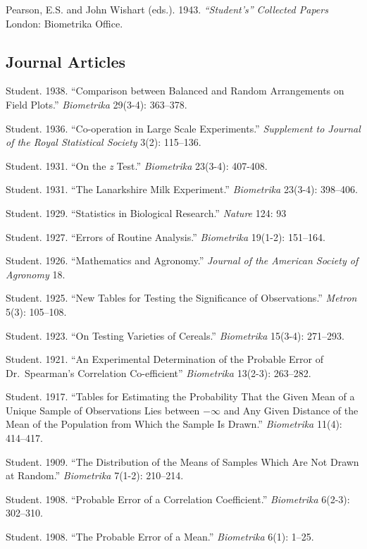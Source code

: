 \documentclass[11pt,]{article}
\begin{document}
Pearson, E.S. and John Wishart (eds.). 1943. \emph{``Student's''
Collected Papers} London: Biometrika Office.

\hypertarget{journal-articles}{%
\subsection{Journal Articles}\label{journal-articles}}

Student. 1938. ``Comparison between Balanced and Random Arrangements on
Field Plots.'' \emph{Biometrika} 29(3-4): 363--378.

Student. 1936. ``Co-operation in Large Scale Experiments.''
\emph{Supplement to Journal of the Royal Statistical Society} 3(2):
115--136.

Student. 1931. ``On the \emph{z} Test.'' \emph{Biometrika} 23(3-4):
407-408.

Student. 1931. ``The Lanarkshire Milk Experiment.'' \emph{Biometrika}
23(3-4): 398--406.

Student. 1929. ``Statistics in Biological Research.'' \emph{Nature} 124:
93

Student. 1927. ``Errors of Routine Analysis.'' \emph{Biometrika}
19(1-2): 151--164.

Student. 1926. ``Mathematics and Agronomy.'' \emph{Journal of the
American Society of Agronomy} 18.

Student. 1925. ``New Tables for Testing the Significance of
Observations.'' \emph{Metron} 5(3): 105--108.

Student. 1923. ``On Testing Varieties of Cereals.'' \emph{Biometrika}
15(3-4): 271--293.

Student. 1921. ``An Experimental Determination of the Probable Error of
Dr.~Spearman's Correlation Co-efficient'' \emph{Biometrika} 13(2-3):
263--282.

Student. 1917. ``Tables for Estimating the Probability That the Given
Mean of a Unique Sample of Observations Lies between \(-\infty\) and Any
Given Distance of the Mean of the Population from Which the Sample Is
Drawn.'' \emph{Biometrika} 11(4): 414--417.

Student. 1909. ``The Distribution of the Means of Samples Which Are Not
Drawn at Random.'' \emph{Biometrika} 7(1-2): 210--214.

Student. 1908. ``Probable Error of a Correlation Coefficient.''
\emph{Biometrika} 6(2-3): 302--310.

Student. 1908. ``The Probable Error of a Mean.'' \emph{Biometrika} 6(1):
1--25.
\end{document}
